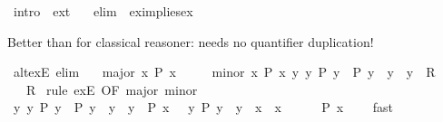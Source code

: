 \begin{isabellebody}
\isanewline
{}\isamarkupfalse%
\ {\isacharbrackleft}{\kern0pt}intro{\isacharquery}{\kern0pt}{\isacharbrackright}{\kern0pt}\ {\isacharequal}{\kern0pt}\ ext\isanewline
\ \ \ {\isacharbrackleft}{\kern0pt}elim{\isacharquery}{\kern0pt}{\isacharbrackright}{\kern0pt}\ {\isacharequal}{\kern0pt}\ ex{}{\isacharunderscore}{\kern0pt}implies{\isacharunderscore}{\kern0pt}ex%
\begin{isamarkuptext}%
Better than  for classical reasoner: needs no quantifier duplication!%
\end{isamarkuptext}\isamarkuptrue%
\isamarkupfalse%
\ alt{\isacharunderscore}{\kern0pt}ex{}E\ {\isacharbrackleft}{\kern0pt}elim{\isacharbang}{\kern0pt}{\isacharbrackright}{\kern0pt}{\isacharcolon}{\kern0pt}\isanewline
\ \ \ major{\isacharcolon}{\kern0pt}\ {\isachardoublequoteopen}{\isasymexists}{\isacharbang}{\kern0pt}x{\isachardot}{\kern0pt}\ P\ x{\isachardoublequoteclose}\isanewline
\ \ \ \ \ minor{\isacharcolon}{\kern0pt}\ {\isachardoublequoteopen}{\isasymAnd}x{\isachardot}{\kern0pt}\ {\isasymlbrakk}P\ x{\isacharsemicolon}{\kern0pt}\ {\isasymforall}y\ y{\isacharprime}{\kern0pt}{\isachardot}{\kern0pt}\ P\ y\ {\isasymand}\ P\ y{\isacharprime}{\kern0pt}\ {\isasymlongrightarrow}\ y\ {\isacharequal}{\kern0pt}\ y{\isacharprime}{\kern0pt}{\isasymrbrakk}\ {\isasymLongrightarrow}\ R{\isachardoublequoteclose}\isanewline
\ \ \ R\isanewline
%
\isadelimproof
%
\endisadelimproof
%
\isatagproof
{}\isamarkupfalse%
\ {\isacharparenleft}{\kern0pt}rule\ ex{}E\ {\isacharbrackleft}{\kern0pt}OF\ major\ minor{\isacharbrackright}{\kern0pt}{\isacharparenright}{\kern0pt}\isanewline
\ \ \isamarkupfalse%
\ {\isachardoublequoteopen}{\isasymforall}y\ y{\isacharprime}{\kern0pt}{\isachardot}{\kern0pt}\ P\ y\ {\isasymand}\ P\ y{\isacharprime}{\kern0pt}\ {\isasymlongrightarrow}\ y\ {\isacharequal}{\kern0pt}\ y{\isacharprime}{\kern0pt}{\isachardoublequoteclose}\ \ {\isachardoublequoteopen}P\ x{\isachardoublequoteclose}\ \ {\isasymsection}{\isacharcolon}{\kern0pt}\ {\isachardoublequoteopen}{\isasymforall}y{\isachardot}{\kern0pt}\ P\ y\ {\isasymlongrightarrow}\ y\ {\isacharequal}{\kern0pt}\ x{\isachardoublequoteclose}\ \ x\isanewline
\ \ \ \ \isamarkupfalse%
\ {\isacartoucheopen}P\ x{\isacartoucheclose}\ {\isasymsection}\ {\isasymsection}\ \isamarkupfalse%
\ fast\isanewline
{}\isamarkupfalse%

\end{isabellebody}
